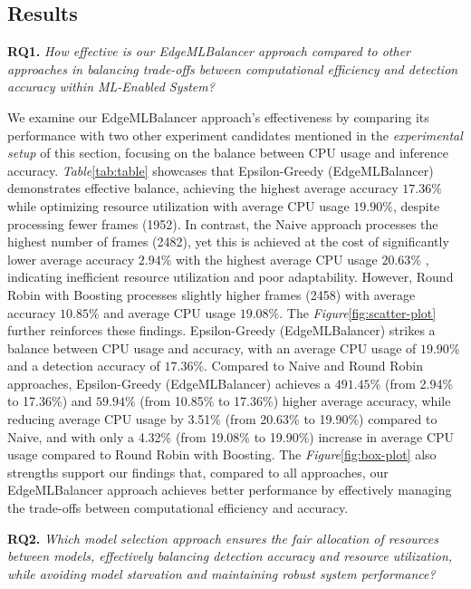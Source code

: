 \subsection{Results}

\noindent
\textbf{RQ1.} \textit{How effective is our EdgeMLBalancer approach compared to other approaches in balancing trade-offs between computational efficiency and detection accuracy within ML-Enabled System?} 

\smallskip
\noindent
We examine our EdgeMLBalancer approach's effectiveness by comparing its performance with two other experiment candidates mentioned in the \textit{experimental setup} of this section, focusing on the balance between CPU usage and inference accuracy. \textit{Table}\ref{tab:table} showcases that Epsilon-Greedy (EdgeMLBalancer) demonstrates effective balance, achieving the highest average accuracy \(17.36\%\) while optimizing resource utilization with average CPU usage \(19.90\%\), despite processing fewer frames (1952). In contrast, the Naive approach processes the highest number of frames (2482), yet this is achieved at the cost of significantly lower average accuracy \(2.94\%\) with the highest average CPU usage \(20.63\%\) , indicating inefficient resource utilization and poor adaptability. However, Round Robin with Boosting processes slightly higher frames (2458) with average accuracy \(10.85\%\) and average CPU usage \(19.08\%\). The \textit{Figure}\ref{fig:scatter-plot} further reinforces these findings. Epsilon-Greedy (EdgeMLBalancer) strikes a balance between CPU usage and accuracy, with an average CPU usage of \(19.90\%\) and a detection accuracy of \(17.36\%\). Compared to Naive and Round Robin approaches, Epsilon-Greedy (EdgeMLBalancer) achieves a \(491.45\%\) (from 2.94\% to 17.36\%) and \(59.94\%\) (from 10.85\% to 17.36\%) higher average accuracy, while reducing average CPU usage by 3.51\% (from 20.63\% to 19.90\%) compared to Naive, and with only a 4.32\% (from 19.08\% to 19.90\%) increase in average CPU usage compared to Round Robin with Boosting. The \textit{Figure}\ref{fig:box-plot} also strengths support our findings that, compared to all approaches, our EdgeMLBalancer approach achieves better performance by effectively managing the trade-offs between computational efficiency and accuracy. 

\smallskip
\noindent
\textbf{RQ2.} \textit{Which model selection approach ensures the fair allocation of resources between models, effectively balancing detection accuracy and resource utilization, while avoiding model starvation and maintaining robust system performance?} 

